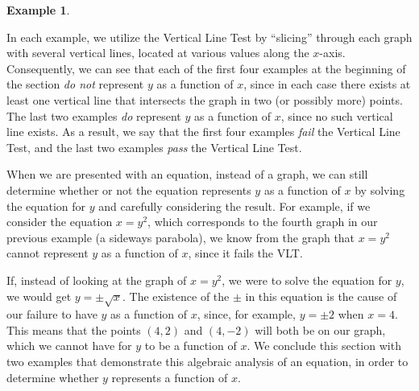 \documentclass[12pt]{book}
\theoremstyle{definition}
\newtheorem{example}{Example}
\begin{document}
\begin{example}
\begin{center}
\begin{multicols}{2}
\columnbreak

\end{multicols}
\end{center}
\end{example}
In each example, we utilize the Vertical Line Test by ``slicing'' through each graph with several vertical lines, located at various values along the $x$-axis.  Consequently, we can see that each of the first four examples at the beginning of the section {\it do not} represent $y$ as a function of $x$, since in each case there exists at least one vertical line that intersects the graph in two (or possibly more) points.  The last two examples {\it do} represent $y$ as a function of $x$, since no such vertical line exists.  As a result, we say that the first four examples {\it fail} the Vertical Line Test, and the last two examples {\it pass} the Vertical Line Test.\par
When we are presented with an equation, instead of a graph, we can still determine whether or not the equation represents $y$ as a function of $x$ by solving the equation for $y$ and carefully considering the result.  For example, if we consider the equation $x=y^2$, which corresponds to the fourth graph in our previous example (a sideways parabola), we know from the graph that $x=y^2$ cannot represent $y$ as a function of $x$, since it fails the VLT.\par
If, instead of looking at the graph of $x=y^2$, we were to solve the equation for $y$, we would get $y=\pm\sqrt{x}$.  The existence of the $\pm$ in this equation is the cause of our failure to have $y$ as a function of $x$, since, for example, $y=\pm 2$ when $x=4$.  This means that the points $(4,2)$ and $(4,-2)$ will both be on our graph, which we cannot have for $y$ to be a function of $x$.  We conclude this section with two examples that demonstrate this algebraic analysis of an equation, in order to determine whether $y$ represents a function of $x$.
\end{document}
